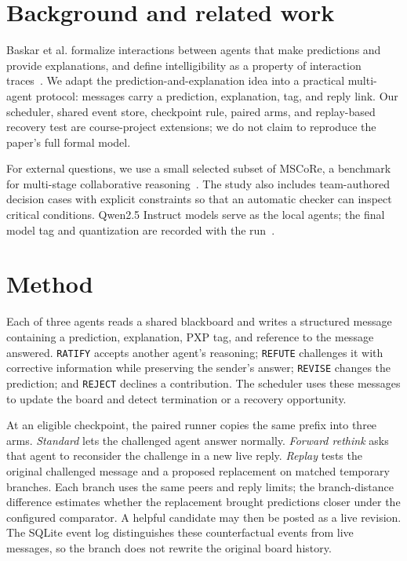 \documentclass[11pt,a4paper,twocolumn]{article}
\begin{document}
\section{Background and related work}
Baskar et al. formalize interactions between agents that make predictions and provide explanations, and define intelligibility as a property of interaction traces~\cite{baskar}. We adapt the prediction-and-explanation idea into a practical multi-agent protocol: messages carry a prediction, explanation, tag, and reply link. Our scheduler, shared event store, checkpoint rule, paired arms, and replay-based recovery test are course-project extensions; we do not claim to reproduce the paper's full formal model.

For external questions, we use a small selected subset of MSCoRe, a benchmark for multi-stage collaborative reasoning~\cite{mscore}. The study also includes team-authored decision cases with explicit constraints so that an automatic checker can inspect critical conditions. Qwen2.5 Instruct models serve as the local agents; the final model tag and quantization are recorded with the run~\cite{qwen}.

\section{Method}
Each of three agents reads a shared blackboard and writes a structured message containing a prediction, explanation, PXP tag, and reference to the message answered. \texttt{RATIFY} accepts another agent's reasoning; \texttt{REFUTE} challenges it with corrective information while preserving the sender's answer; \texttt{REVISE} changes the prediction; and \texttt{REJECT} declines a contribution. The scheduler uses these messages to update the board and detect termination or a recovery opportunity.

At an eligible checkpoint, the paired runner copies the same prefix into three arms. \emph{Standard} lets the challenged agent answer normally. \emph{Forward rethink} asks that agent to reconsider the challenge in a new live reply. \emph{Replay} tests the original challenged message and a proposed replacement on matched temporary branches. Each branch uses the same peers and reply limits; the branch-distance difference estimates whether the replacement brought predictions closer under the configured comparator. A helpful candidate may then be posted as a live revision. The SQLite event log distinguishes these counterfactual events from live messages, so the branch does not rewrite the original board history.
\end{document}
